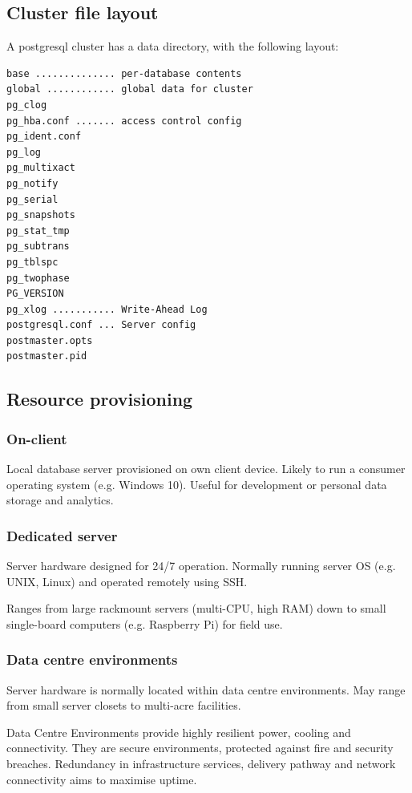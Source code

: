 \documentclass{pgnotes}
\begin{document}
\subsection{Cluster file layout}

A postgresql cluster has a data directory, with the following layout:

\begin{verbatim}
base .............. per-database contents
global ............ global data for cluster
pg_clog
pg_hba.conf ....... access control config
pg_ident.conf
pg_log
pg_multixact
pg_notify
pg_serial
pg_snapshots
pg_stat_tmp
pg_subtrans
pg_tblspc
pg_twophase
PG_VERSION
pg_xlog ........... Write-Ahead Log
postgresql.conf ... Server config
postmaster.opts
postmaster.pid

\end{verbatim}


\subsection{Resource provisioning}

\subsubsection{On-client} 

Local database server provisioned on own client device.
Likely to run a consumer operating system (e.g. Windows 10). 
Useful for development or personal data storage and analytics.

\subsubsection{Dedicated server} 

Server hardware designed for 24/7 operation.
Normally running server OS (e.g. UNIX, Linux) and operated remotely using SSH.

Ranges from large rackmount servers (multi-CPU, high RAM) down to  small single-board computers (e.g. Raspberry Pi) for field use. 

\subsubsection{Data centre environments}

Server hardware is normally located within data centre environments.
May range from small server closets to multi-acre facilities.
 
Data Centre Environments provide highly resilient power, cooling and connectivity.
They are secure environments, protected against fire and security breaches.
Redundancy in infrastructure services, delivery pathway and network connectivity aims to maximise uptime.
\end{document}
